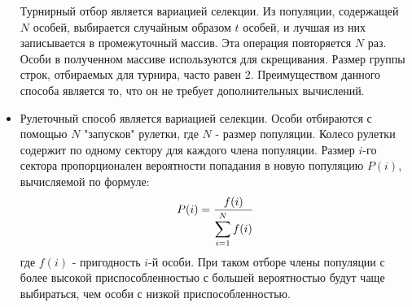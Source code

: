 \begin{itemize}[label=$\ast$]
Турнирный отбор является вариацией селекции. Из популяции, содержащей $N$ особей, выбирается случайным образом $t$ особей, и лучшая из них записывается в промежуточный массив. Эта операция повторяется $N$ раз. Особи в полученном массиве используются для скрещивания. Размер группы строк, отбираемых для турнира, часто равен 2. Преимуществом данного способа является то, что он не требует дополнительных вычислений.
	\item {}

Рулеточный способ является вариацией селекции. Особи отбираются с помощью $N$ "запусков" рулетки, где $N$ - размер популяции. Колесо рулетки содержит по одному сектору для каждого члена популяции. Размер $i$-го сектора пропорционален вероятности попадания в новую популяцию $P(i)$, вычисляемой по формуле:
\begin{eqnarray*}
	P(i) = \frac{f(i)}{\displaystyle \sum\displaylimits_{i=1}^{N} f(i)}
\end{eqnarray*}
где $f(i)$ - пригодность $i$-й особи.
При таком отборе члены популяции с более высокой приспособленностью с большей вероятностью будут чаще выбираться, чем особи с низкой приспособленностью.
\end{itemize}

